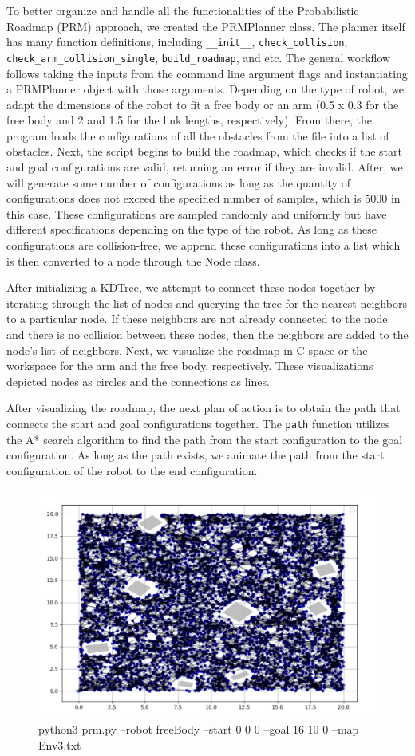 \documentclass{article}
\begin{document}
To better organize and handle all the functionalities of the Probabilistic Roadmap (PRM) approach, we created the PRMPlanner class. The planner itself has many function definitions, including \texttt{\_\_init\_\_}, \texttt{check\_collision}, \texttt{check\_arm\_collision\_single}, \texttt{build\_roadmap}, and etc. The general workflow follows taking the inputs from the command line argument flags and instantiating a PRMPlanner object with those arguments. Depending on the type of robot, we adapt the dimensions of the robot to fit a free body or an arm (0.5 x 0.3 for the free body and 2 and 1.5 for the link lengths, respectively). From there, the program loads the configurations of all the obstacles from the file into a list of obstacles. Next, the script begins to build the roadmap, which checks if the start and goal configurations are valid, returning an error if they are invalid. After, we will generate some number of configurations as long as the quantity of configurations does not exceed the specified number of samples, which is 5000 in this case. These configurations are sampled randomly and uniformly but have different specifications depending on the type of the robot. As long as these configurations are collision-free, we append these configurations into a list which is then converted to a node through the Node class.

After initializing a KDTree, we attempt to connect these nodes together by iterating through the list of nodes and querying the tree for the nearest neighbors to a particular node. If these neighbors are not already connected to the node and there is no collision between these nodes, then the neighbors are added to the node's list of neighbors. Next, we visualize the roadmap in C-space or the workspace for the arm and the free body, respectively. These visualizations depicted nodes as circles and the connections as lines.

After visualizing the roadmap, the next plan of action is to obtain the path that connects the start and goal configurations together. The \texttt{path} function utilizes the A* search algorithm to find the path from the start configuration to the goal configuration. As long as the path exists, we animate the path from the start configuration of the robot to the end configuration.

\begin{figure} [H]
    \centering
    \includegraphics[width=0.7\linewidth]{latex_media/prm_freebody_env3_conf1.png}
    \caption{python3 prm.py --robot freeBody --start 0 0 0 --goal 16 10 0 --map Env3.txt}
\end{figure}
\end{document}
